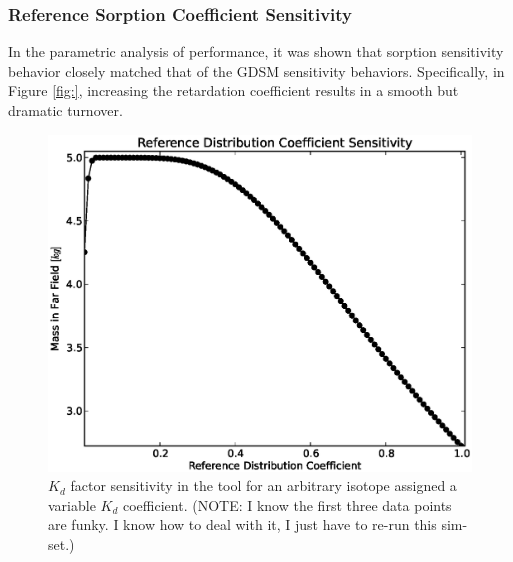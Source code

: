 
\subsubsection{Reference Sorption Coefficient Sensitivity}

In the parametric analysis of \Cyder performance, it was shown that sorption 
sensitivity behavior closely matched that of the \gls{GDSM} sensitivity 
behaviors. Specifically, in Figure \ref{fig:}, increasing the retardation 
coefficient results in a smooth but dramatic turnover. 

\begin{figure}[ht]
\centering
\includegraphics[width=0.7\linewidth]{./chapters/demonstration/bench/kd.eps}
\caption{$K_d$ factor sensitivity in the \Cyder tool for an arbitrary isotope 
assigned a variable $K_d$ coefficient. (NOTE: I know the first three data 
points are funky. I know how to deal with it, I just have to re-run this 
sim-set.)}
\label{fig:kd_result}
\end{figure}
